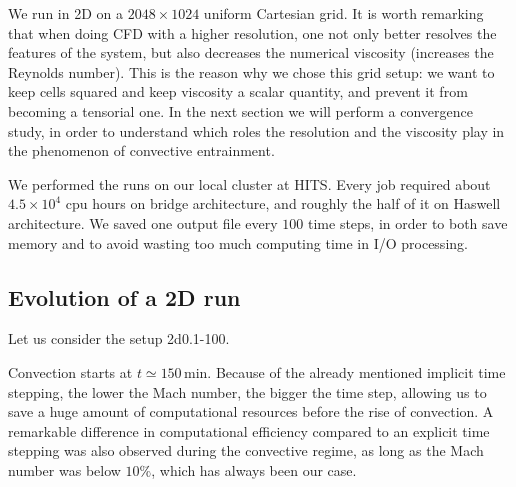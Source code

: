 We run in 2D on a $2048 \times 1024$ uniform Cartesian grid. It is worth remarking that when doing CFD with a higher resolution, one not only better resolves the features of the system, but also decreases the numerical viscosity (increases the Reynolds number). This is the reason why we chose this grid setup: we want to keep cells squared and keep viscosity a scalar quantity, and prevent it from becoming a tensorial one. In the next section we will perform a convergence study, in order to understand which roles the resolution and the viscosity play in the phenomenon of convective entrainment.

We performed the runs on our local cluster at HITS. Every job required about $4.5 \times 10^{4}$ cpu hours on bridge architecture, and roughly the half of it on Haswell architecture. We saved one output file every $100$ time steps, in order to both save memory and to avoid wasting too much computing time in I/O processing.


\subsection{Evolution of a 2D run}\label{single2d}

Let us consider the setup 2d0.1-100. 

Convection starts at $t \simeq 150 \, \mathrm{min}$. Because of the already mentioned implicit time stepping, the lower the Mach number, the bigger the time step, allowing us to save a huge amount of computational resources before the rise of convection. A remarkable difference in computational efficiency compared to an explicit time stepping was also observed during the convective regime, as long as the Mach number was below $10 \%$, which has always been our case.

